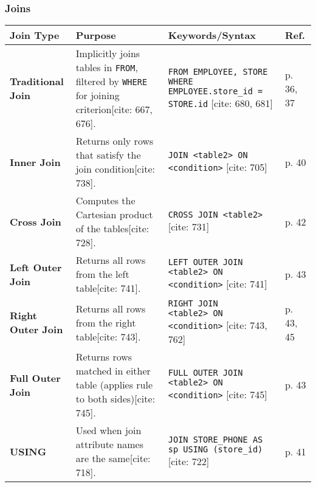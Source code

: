 \documentclass[12pt,a4paper]{article}
\begin{document}
\subsubsection*{Joins}
\begin{longtable}{>{\bfseries}p{} p{} p{} p{}}
\toprule
\textbf{Join Type} & \textbf{Purpose} & \textbf{Keywords/Syntax} & \textbf{Ref.} \\
\midrule
\endhead
\textbf{Traditional Join} & Implicitly joins tables in \texttt{FROM}, filtered by \texttt{WHERE} for joining criterion[cite: 667, 676]. & \texttt{FROM EMPLOYEE, STORE WHERE EMPLOYEE.store\_id = STORE.id} [cite: 680, 681] & p. 36, 37 \\
\textbf{Inner Join} & Returns only rows that satisfy the join condition[cite: 738]. & \texttt{JOIN \textless table2\textgreater\ ON \textless condition\textgreater} [cite: 705] & p. 40 \\
\textbf{Cross Join} & Computes the Cartesian product of the tables[cite: 728]. & \texttt{CROSS JOIN \textless table2\textgreater} [cite: 731] & p. 42 \\
\textbf{Left Outer Join} & Returns all rows from the left table[cite: 741]. & \texttt{LEFT OUTER JOIN \textless table2\textgreater\ ON \textless condition\textgreater} [cite: 741] & p. 43 \\
\textbf{Right Outer Join} & Returns all rows from the right table[cite: 743]. & \texttt{RIGHT JOIN \textless table2\textgreater\ ON \textless condition\textgreater} [cite: 743, 762] & p. 43, 45 \\
\textbf{Full Outer Join} & Returns rows matched in either table (applies rule to both sides)[cite: 745]. & \texttt{FULL OUTER JOIN \textless table2\textgreater\ ON \textless condition\textgreater} [cite: 745] & p. 43 \\
\textbf{USING} & Used when join attribute names are the same[cite: 718]. & \texttt{JOIN STORE\_PHONE AS sp USING (store\_id)} [cite: 722] & p. 41 \\
\bottomrule
\end{longtable}

\vspace{0.5cm}
\end{document}

